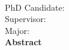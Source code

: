 
\pagestyle{frontmatterstyle}

\begin{center}
  {\bfseries \thesistitleenvalue}\\[6pt]

  {
   PhD Candidate: \@applicant \\
   Supervisor: \@supervisor \\
   Major: \@majorcn
  }\\[12pt]

  {\bfseries Abstract}\\[6pt]
\end{center}

